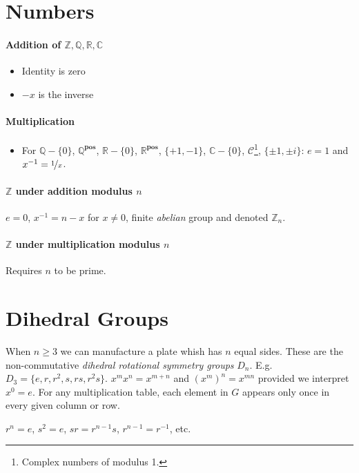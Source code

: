\documentclass[a4paper,twocolumn,10pt]{article}
\begin{document}
  \section{Numbers}
  \paragraph{Addition of $\mathbb{Z}, \mathbb{Q}, \mathbb{R}, \mathbb{C}$}
  \begin{itemize}
    \item Identity is zero
    \item $-x$ is the inverse
  \end{itemize}
  \paragraph{Multiplication}
  \begin{itemize}
  \item For $\mathbb{Q}-\{0\}$, $\mathbb{Q}^{\textbf{pos}}$,
    $\mathbb{R}-\{0\}$, $\mathbb{R}^{\textbf{pos}}$, $\{+1,-1\}$,
    $\mathbb{C}-\{0\}$, $\mathcal{C}$\footnote{Complex numbers of modulus 1.},
    $\{\pm 1, \pm i\}$: $e=1$ and $x^{-1}=\nicefrac{1}{x}$.
  \end{itemize}

  \paragraph{$\mathbb{Z}$ under addition modulus $n$} $e=0$,
  $x^{-1}=n-x$ for $x\ne0$, finite \textit{abelian} group and denoted
  $\mathbb{Z}_n$.

  \paragraph{$\mathbb{Z}$ under multiplication modulus $n$} Requires $n$ to be
  prime.

  \section{Dihedral Groups}
  When $n\geqslant3$ we can manufacture a plate whish has $n$ equal sides. These are
  the non-commutative \textit{dihedral rotational symmetry groups} $D_n$. E.g.
  $D_3 = \{e,r,r^2,s,rs,r^2s\}$. $x^mx^n=x^{m+n}$ and $(x^m)^n=x^{mn}$ provided
  we interpret $x^0=e$. For any multiplication table, each element in $G$
  appears only once in every given column or row.

  $r^n=e$, $s^2=e$, $sr=r^{n-1}s$, $r^{n-1}=r^{-1}$, etc.
\end{document}
